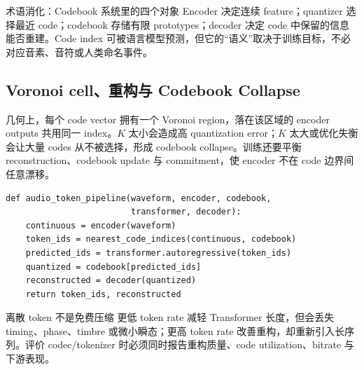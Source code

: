 

\begin{knowledgebox}{术语消化：Codebook 系统里的四个对象}
Encoder 决定连续 feature；quantizer 选择最近 code；codebook 存储有限 prototypes；decoder 决定 code 中保留的信息能否重建。Code index 可被语言模型预测，但它的“语义”取决于训练目标，不必对应音素、音符或人类命名事件。
\end{knowledgebox}

\subsection{Voronoi cell、重构与 Codebook Collapse}

几何上，每个 code vector 拥有一个 Voronoi region，落在该区域的 encoder outputs 共用同一 index。$K$ 太小会造成高 quantization error；$K$ 太大或优化失衡会让大量 codes 从不被选择，形成 codebook collapse。训练还要平衡 reconstruction、codebook update 与 commitment，使 encoder 不在 code 边界间任意漂移。



\begin{lstlisting}[caption={离散 audio-token 建模的概念流程。}]
def audio_token_pipeline(waveform, encoder, codebook,
                         transformer, decoder):
    continuous = encoder(waveform)
    token_ids = nearest_code_indices(continuous, codebook)
    predicted_ids = transformer.autoregressive(token_ids)
    quantized = codebook[predicted_ids]
    reconstructed = decoder(quantized)
    return token_ids, reconstructed
\end{lstlisting}

\begin{warningbox}{离散 token 不是免费压缩}
更低 token rate 减轻 Transformer 长度，但会丢失 timing、phase、timbre 或微小瞬态；更高 token rate 改善重构，却重新引入长序列。评价 codec/tokenizer 时必须同时报告重构质量、code utilization、bitrate 与下游表现。
\end{warningbox}


